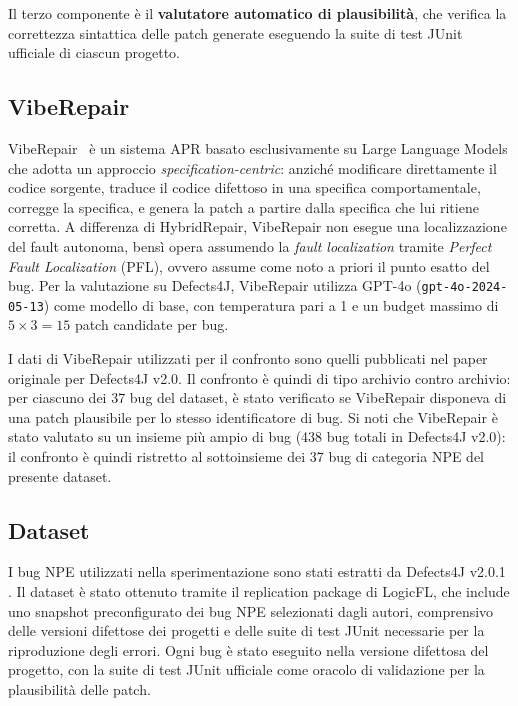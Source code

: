 Il terzo componente è il \textbf{valutatore automatico di plausibilità}, che verifica 
la correttezza sintattica delle patch generate eseguendo la suite di test 
JUnit ufficiale di ciascun progetto.

\subsection{VibeRepair}

VibeRepair~\cite{zhu2026specification} è un sistema APR basato esclusivamente su Large Language 
Models che adotta un approccio \emph{specification-centric}: anziché modificare 
direttamente il codice sorgente, traduce il codice difettoso in una specifica 
comportamentale, corregge la specifica, e genera la patch a partire dalla specifica che lui ritiene
corretta. A differenza di HybridRepair, VibeRepair non esegue una localizzazione del 
fault autonoma, bensì opera assumendo la \emph{fault localization} tramite \emph{Perfect Fault Localization} 
(PFL), ovvero assume come noto a priori il punto esatto del bug. Per la valutazione 
su Defects4J, VibeRepair utilizza GPT-4o (\texttt{gpt-4o-2024-05-13}) come modello 
di base, con temperatura pari a 1 e un budget massimo di $5 \times 3 = 15$ patch 
candidate per bug.

I dati di VibeRepair utilizzati per il confronto sono quelli pubblicati 
nel paper originale \cite{zhu2026specification} per Defects4J v2.0. Il confronto è quindi di 
tipo archivio contro archivio: per ciascuno dei 37 bug del dataset, è stato verificato 
se VibeRepair disponeva di una patch plausibile per lo stesso identificatore di bug. 
Si noti che VibeRepair è stato valutato su un insieme più ampio di bug (438 bug totali 
in Defects4J v2.0): il confronto è quindi ristretto al sottoinsieme dei 37 bug di categoria NPE del 
presente dataset.

\subsection{Dataset}

I bug NPE utilizzati nella sperimentazione sono stati estratti da Defects4J v2.0.1 \cite{just2014defects4j}. Il dataset è stato
ottenuto tramite il replication package di LogicFL, che include uno snapshot preconfigurato dei bug NPE selezionati dagli autori,
comprensivo delle versioni difettose dei progetti e delle suite di test JUnit necessarie per la riproduzione degli errori. Ogni bug
è stato eseguito nella versione difettosa del progetto, con la suite di test JUnit ufficiale come oracolo di validazione per la
plausibilità delle patch.

